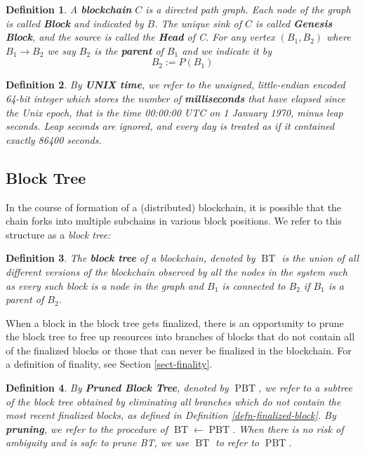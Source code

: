 \documentclass{book}
\newcommand{\assign}{:=}
\newcommand{\tmem}[1]{{\em #1\/}}
\newcommand{\tmop}[1]{\ensuremath{\operatorname{#1}}}
\newcommand{\tmstrong}[1]{\textbf{#1}}
\newtheorem{definition}{Definition}
\newtheorem{definition}{Definition}
\begin{document}
\begin{definition}
  A {\tmstrong{blockchain}} $C$ is a directed path graph. Each node of the
  graph is called {\tmstrong{Block}} and indicated by {\tmstrong{$B$}}. The
  unique sink of $C$ is called {\tmstrong{Genesis Block}}, and the source is
  called the {\tmstrong{Head}} of C. For any vertex $(B_1, B_2)$ where $B_1
  \rightarrow B_2$ we say $B_2$ is the {\tmstrong{parent}} of $B_1$ and we
  indicate it by
  \[ B_2 \assign P (B_1) \]
\end{definition}

\begin{definition}
  \label{defn-unix-time}By {\tmstrong{UNIX time}}, we refer to the unsigned,
  little-endian encoded 64-bit integer which stores the number of
  {\tmstrong{milliseconds}} that have elapsed since the Unix epoch, that is
  the time 00:00:00 UTC on 1 January 1970, minus leap seconds. Leap seconds
  are ignored, and every day is treated as if it contained exactly 86400
  seconds.
\end{definition}

\subsection{Block Tree}

In the course of formation of a (distributed) blockchain, it is possible that
the chain forks into multiple subchains in various block positions. We refer
to this structure as a {\tmem{block tree:}}

\begin{definition}
  \label{defn-block-tree}The {\tmstrong{block tree}} of a blockchain, denoted
  by $\tmop{BT}$ is the union of all different versions of the blockchain
  observed by all the nodes in the system such as every such block is a node
  in the graph and $B_1$ is connected to $B_2$ if $B_1$ is a parent of $B_2$.
\end{definition}

When a block in the block tree gets finalized, there is an opportunity to
prune the block tree to free up resources into branches of blocks that do not
contain all of the finalized blocks or those that can never be finalized in
the blockchain. For a definition of finality, see Section \ref{sect-finality}.

\begin{definition}
  \label{defn-pruned-tree}By {\tmstrong{Pruned Block Tree}}, denoted by
  $\tmop{PBT}$, we refer to a subtree of the block tree obtained by
  eliminating all branches which do not contain the most recent finalized
  blocks, as defined in Definition \ref{defn-finalized-block}. By
  {\tmstrong{pruning}}, we refer to the procedure of $\tmop{BT} \leftarrow
  \tmop{PBT}$. When there is no risk of ambiguity and is safe to prune BT, we
  use $\tmop{BT}$ to refer to $\tmop{PBT}$.
\end{definition}
\end{document}
